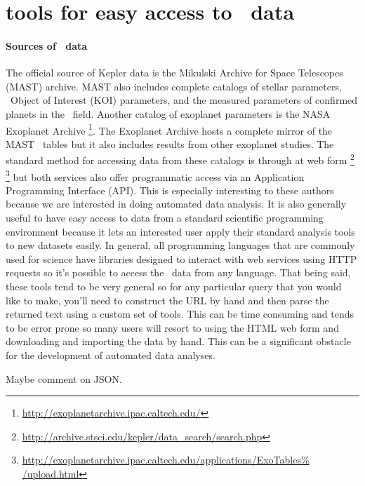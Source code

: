 \documentclass[letterpaper,12pt,preprint]{hack_aastex}
\begin{document}
\section{tools for easy access to \Kepler\ data}

\paragraph{Sources of \Kepler\ data}
The official source of Kepler data is the Mikulski Archive for Space
Telescopes (MAST) archive.
MAST also includes complete catalogs of stellar parameters, \Kepler\ Object of
Interest (KOI) parameters, and the measured parameters of confirmed planets
in the \Kepler\ field.
Another catalog of exoplanet parameters is the NASA Exoplanet Archive%
\footnote{\url{http://exoplanetarchive.ipac.caltech.edu/}}.
The Exoplanet Archive hosts a complete mirror of the MAST \Kepler\ tables but
it also includes results from other exoplanet studies.
The standard method for accessing data from these catalogs is through at web
form%
\footnote{\url{http://archive.stsci.edu/kepler/data\_search/search.php}}%
\footnote{\url{http://exoplanetarchive.ipac.caltech.edu/applications/ExoTables%
/upload.html}}
but both services also offer programmatic access via an Application
Programming Interface (API).
This is especially interesting to these authors because we are interested in
doing automated data analysis.
It is also generally useful to have easy access to data from a standard
scientific programming environment because it lets an interested user apply
their standard analysis tools to new datasets easily.
In general, all programming languages that are commonly used for science have
libraries designed to interact with web services using HTTP requests so it's
possible to access the \Kepler\ data from any language.
That being said, these tools tend to be very general so for any particular
query that you would like to make, you'll need to construct the URL by hand
and then parse the returned text using a custom set of tools.
This can be time consuming and tends to be error prone so many users will
resort to using the HTML web form and downloading and importing the data by
hand.
This can be a significant obstacle for the development of automated data
analyses.

Maybe comment on JSON.\
\end{document}
